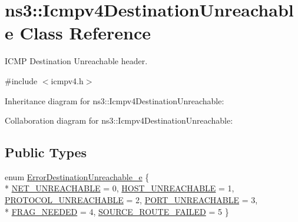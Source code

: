 \hypertarget{classns3_1_1Icmpv4DestinationUnreachable}{}\section{ns3\+:\+:Icmpv4\+Destination\+Unreachable Class Reference}
\label{classns3_1_1Icmpv4DestinationUnreachable}


I\+C\+MP Destination Unreachable header.  




{\ttfamily \#include $<$icmpv4.\+h$>$}



Inheritance diagram for ns3\+:\+:Icmpv4\+Destination\+Unreachable\+:


Collaboration diagram for ns3\+:\+:Icmpv4\+Destination\+Unreachable\+:
\subsection*{Public Types}
\begin{DoxyCompactItemize}
\item 
enum \hyperlink{classns3_1_1Icmpv4DestinationUnreachable_ad2d32577d890056658b8c0a577e941f1}{Error\+Destination\+Unreachable\+\_\+e} \{ \\*
\hyperlink{classns3_1_1Icmpv4DestinationUnreachable_ad2d32577d890056658b8c0a577e941f1ae685fba07cef8e2403014ad280489d4e}{N\+E\+T\+\_\+\+U\+N\+R\+E\+A\+C\+H\+A\+B\+LE} = 0, 
\hyperlink{classns3_1_1Icmpv4DestinationUnreachable_ad2d32577d890056658b8c0a577e941f1a1b929462040f41878c297a39dc085045}{H\+O\+S\+T\+\_\+\+U\+N\+R\+E\+A\+C\+H\+A\+B\+LE} = 1, 
\hyperlink{classns3_1_1Icmpv4DestinationUnreachable_ad2d32577d890056658b8c0a577e941f1aa0ea06d030c7bcfdc85c63a4a830ed14}{P\+R\+O\+T\+O\+C\+O\+L\+\_\+\+U\+N\+R\+E\+A\+C\+H\+A\+B\+LE} = 2, 
\hyperlink{classns3_1_1Icmpv4DestinationUnreachable_ad2d32577d890056658b8c0a577e941f1a38a797468589b2384647211898a4b1a0}{P\+O\+R\+T\+\_\+\+U\+N\+R\+E\+A\+C\+H\+A\+B\+LE} = 3, 
\\*
\hyperlink{classns3_1_1Icmpv4DestinationUnreachable_ad2d32577d890056658b8c0a577e941f1aed86f58801bc08f0d218589e6a875442}{F\+R\+A\+G\+\_\+\+N\+E\+E\+D\+ED} = 4, 
\hyperlink{classns3_1_1Icmpv4DestinationUnreachable_ad2d32577d890056658b8c0a577e941f1a9b3f381a4a0999ac67b6755abe73a75f}{S\+O\+U\+R\+C\+E\+\_\+\+R\+O\+U\+T\+E\+\_\+\+F\+A\+I\+L\+ED} = 5
 \}
\end{DoxyCompactItemize}
